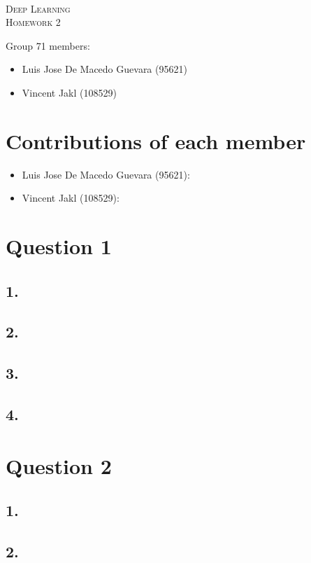\documentclass[11pt]{article}
\begin{document}
\begin{center}
  \mbox{}\\[2.0cm]
  \textsc{\Huge Deep Learning}\\[1.0cm]
  \textsc{\Large Homework 2}\\[0.5cm]
\end{center}
\begin{flushleft}
  Group 71 members: \\[0.5cm]
  \begin{itemize}
  \item Luis Jose De Macedo Guevara (95621)
  \item Vincent Jakl (108529)
  \end{itemize}
\end{flushleft}

\section{Contributions of each member}
\begin{itemize}
    \item Luis Jose De Macedo Guevara (95621):
    \item Vincent Jakl (108529):
\end{itemize}
\pagebreak
\section{Question 1}
\subsection{1.}
\subsection{2.}
\subsection{3.}
\subsection{4.}
\section{Question 2}
\subsection{1.}
\subsection{2.}
\end{document}
